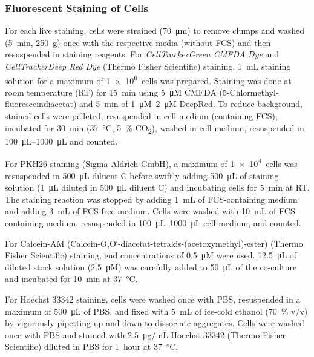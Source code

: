 \subsubsection*{Fluorescent Staining of Cells}
For each live staining, cells were strained (\SI{70}{\micro\meter}) to remove
clumps and washed (\SI{5}{\minute}, \SI{250}{g}) once with the respective media
(without FCS) and then resuspended in staining reagents. For
\textit{CellTracker\texttrademark Green CMFDA Dye} and
\textit{CellTracker\texttrademark Deep Red Dye} (Thermo Fisher Scientific)
staining, \SI{1}{mL} staining solution for a maximum of \SI{1e6}{cells} was
prepared. Staining was done at room temperature (RT) for \SI{15}{\minute} using
\SI{5}{\micro M} CMFDA (5-Chlormethyl-fluoresceindiacetat) and \SI{5}{\minute}
of \SIrange{1}{2}{\micro M} DeepRed. To reduce background, stained cells were
pelleted, resuspended in cell medium (containing FCS), incubated for
\SI{30}{\minute} (\SI{37}{\degreeCelsius}, \SI{5}{\percent}
CO\textsubscript{2}), washed in cell medium, resuspended in
\SIrange{100}{1000}{\micro\liter} and counted.

For PKH26 staining (Sigma Aldrich GmbH), a maximum of \SI{1e4}{cells} was
resuspended in \SI{500}{\micro\liter} diluent C before swiftly adding
\SI{500}{\micro\liter} of staining solution (\SI{1}{\micro\liter} diluted in
\SI{500}{\micro\liter} diluent C) and incubating cells for \SI{5}{\minute} at
RT. The staining reaction was stopped by adding \SI{1}{mL} of FCS-containing
medium and adding \SI{3}{mL} of FCS-free medium. Cells were washed with
\SI{10}{mL} of FCS-containing medium, resuspended in
\SIrange{100}{1000}{\micro\liter} cell medium, and counted.

For Calcein-AM (Calcein-O,O′-diacetat-tetrakis-(acetoxymethyl)-ester) (Thermo
Fisher Scientific) staining, end concentrations of \SI{0.5}{\micro M} were used.
\SI{12.5}{\micro\liter} of diluted stock solution (\SI{2.5}{\micro M}) was
carefully added to \SI{50}{\micro\liter} of the co-culture and incubated for
\SI{10}{\minute} at \SI{37}{\degreeCelsius}.

For Hoechst 33342 staining, cells were washed once with PBS, resuspended in a
maximum of \SI{500}{\micro\liter} of PBS, and fixed with \SI{5}{mL} of ice-cold
ethanol (\SI{70}{\percent} v/v) by vigorously pipetting up and down to
dissociate aggregates. Cells were washed once with PBS and stained with
\SI{2.5}{\micro\gram/mL} Hoechst 33342 (Thermo Fisher Scientific) diluted in PBS
for \SI{1}{hour} at \SI{37}{\degreeCelsius}.




